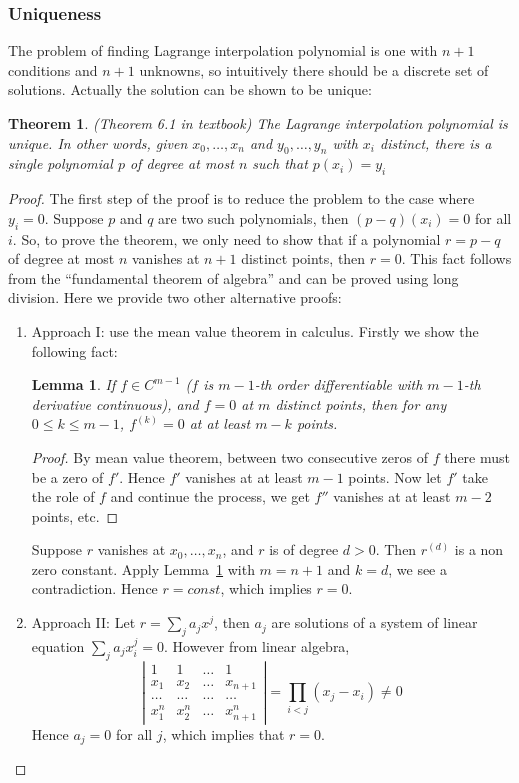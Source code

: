 \documentclass{article} %
\theoremstyle{break}
\newtheorem{lem}[definition]{Lemma}
\newtheorem{thm}[definition]{Theorem}
\begin{document}
  \subsubsection{Uniqueness}
  
  The problem of finding Lagrange interpolation polynomial is one with $n+1$ conditions and $n+1$ unknowns, so intuitively there should be a discrete set of solutions. Actually the solution can be shown to be unique:

  \begin{thm}\label{uniq_lag} (Theorem 6.1 in textbook)
  The Lagrange interpolation polynomial is unique. In other words, given $x_0, \dots, x_n$ and $y_0, \dots, y_n$ with $x_i$ distinct, there is a single polynomial $p$ of degree at most $n$ such that $p(x_i)=y_i$
  \end{thm}

  \begin{proof}
    The first step of the proof is to reduce the problem to the case where $y_i=0$. Suppose $p$ and $q$ are two such polynomials, then $(p-q)(x_i)=0$ for all $i$. So, to prove the theorem, we only need to show that if a polynomial $r=p-q$ of degree at most $n$ vanishes at $n+1$ distinct points, then $r=0$. This fact follows from the ``fundamental theorem of algebra'' and can be proved using long division. Here we provide two other alternative proofs:

    \begin{enumerate}
    \item Approach I: use the mean value theorem in calculus. Firstly we show the following fact:
      \begin{lem}\label{key_lem} If $f \in C^{m-1}$ ($f$ is $m-1$-th order differentiable with $m-1$-th derivative continuous), and $f=0$ at $m$ distinct points, then for any $0\leq k\leq m-1$, $f^{(k)}=0$ at at least $m-k$ points.
      \end{lem}
      \begin{proof}
       By mean value theorem, between two consecutive zeros of $f$ there must be a zero of $f'$. Hence $f'$ vanishes at at least $m-1$ points. Now let $f'$ take the role of $f$ and continue the process, we get $f''$ vanishes at at least $m-2$ points, etc. 
      \end{proof}
      Suppose $r$ vanishes at $x_0, \dots, x_n$, and $r$ is of degree $d>0$. Then $r^{(d)}$ is a non zero constant. Apply Lemma~\ref{key_lem} with $m=n+1$ and $k=d$, we see a contradiction. Hence $r=const$, which implies $r=0$.
  \item Approach II: Let $r=\sum_ja_jx^j$, then $a_j$ are solutions of a system of linear equation $\sum_ja_jx_i^j=0$. However from linear algebra, 
  \[\left|\begin{array}{cccc}1 & 1& \dots & 1\\ x_1 & x_2 &\dots &x_{n+1}\\ \dots & \dots & \dots & \dots \\ x_1^n & x_2^n & \dots & x_{n+1}^n\end{array}\right|=\prod_{i<j}(x_j-x_i)\not=0\]
Hence $a_j=0$ for all $j$, which implies that $r=0$.  
    \end{enumerate}
  \end{proof}
\end{document}
